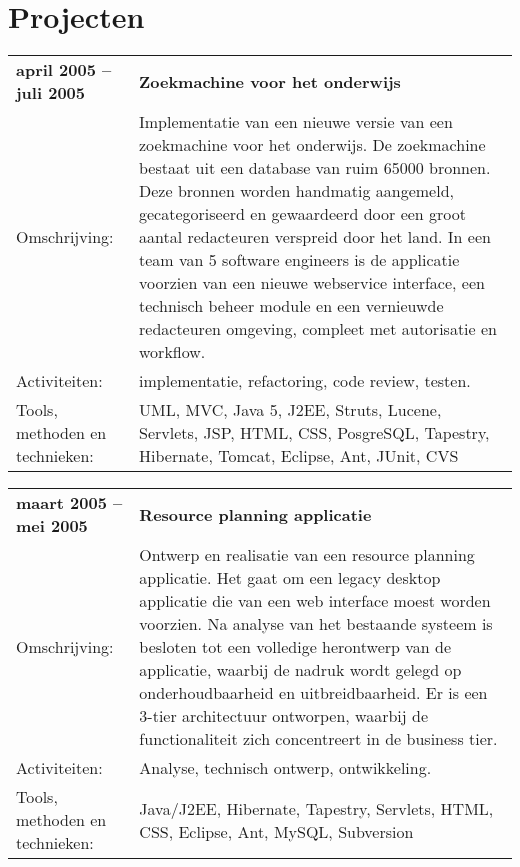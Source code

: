 \documentclass[a4paper]{article}
\newcommand{\postgresql}{Pos\-greSQL}
\newcommand{\mysql}{My\-SQL}
\newcommand{\omschrijving}{Omschrijving:}
\newcommand{\activiteiten}{Activiteiten:}
\newcommand{\tools}{Tools, methoden en technieken:}
\newcommand{\tabelh}[1]{\textbf{#1}}
\begin{document}
        \pagebreak

        \section*{Projecten}
        
        \begin{tabular}{l p{10cm}}
            \tabelh{april 2005 -- juli 2005} & \tabelh{Zoekmachine voor het
            onderwijs} \\

            \omschrijving &
            Implementatie van een nieuwe versie van een zoekmachine voor het
            onderwijs. De zoekmachine bestaat uit een database van ruim 65000
            bronnen. Deze bronnen worden handmatig aangemeld, gecategoriseerd
            en gewaardeerd door een groot aantal redacteuren verspreid door
            het land.  In een team van 5 software engineers is de applicatie
            voorzien van een nieuwe webservice interface, een technisch beheer
            module en een vernieuwde redacteuren omgeving, compleet met
            autorisatie en workflow. \\
            \activiteiten & implementatie, refactoring, code review, testen.\\
            \tools & UML, MVC, Java 5, J2EE, Struts,
            Lucene, Servlets, JSP, HTML, CSS, \postgresql, Tapestry,
            Hibernate, Tomcat, Eclipse, Ant, JUnit, CVS \\
        \end{tabular}

        \medskip
       
        \begin{tabular}{l p{10cm}}
            \tabelh{maart 2005 --  mei 2005} & \tabelh{Resource planning
            applicatie} \\
            \omschrijving & Ontwerp en realisatie van een resource
            planning applicatie. Het gaat om een legacy desktop applicatie die
            van een web interface moest worden voorzien. Na analyse van het
            bestaande systeem is besloten tot een volledige herontwerp van de
            applicatie, waarbij de nadruk wordt gelegd op onderhoudbaarheid en
            uitbreidbaarheid. Er is een 3-tier architectuur ontworpen,
            waarbij de functionaliteit zich concentreert in de business tier. \\
            \activiteiten & Analyse, technisch ontwerp, ontwikkeling. \\
            \tools & Java/J2EE, Hibernate, Tapestry,
            Servlets, HTML, CSS, Eclipse, Ant, \mysql, Subversion \\
        \end{tabular}
\end{document}
